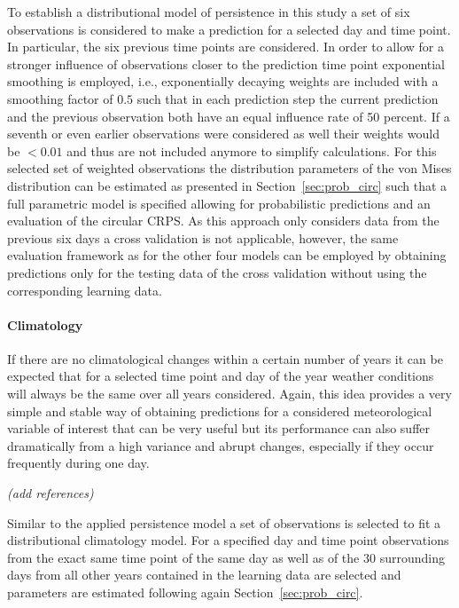 \documentclass[nojss]{jss}
\newcommand{\fixme}[1]{\emph{\marginpar{FIXME} (#1)}}
\numberwithin{equation}{section}
\begin{document}
To establish a distributional model of persistence in this study a set of six observations
is considered to make a prediction for a selected day and time point. In particular,
the six previous time points are considered. In order to allow for a stronger influence of 
observations closer to the prediction time point exponential smoothing is employed, i.e.,
exponentially decaying weights are included with a smoothing factor of $0.5$ such that
in each prediction step the current prediction and the previous observation both have an 
equal influence rate of 50 percent. If a seventh or even earlier observations were considered 
as well their weights would be $<0.01$ and thus are not included anymore to simplify calculations.
For this selected set of weighted observations the distribution parameters of the von Mises 
distribution can be estimated as presented in Section~\ref{sec:prob_circ} such that a full
parametric model is specified allowing for probabilistic predictions and an evaluation of the 
circular CRPS.
As this approach only considers data from the previous six days a cross validation is not 
applicable, however, the same evaluation framework as for the other four models can be employed 
by obtaining predictions only for the testing data of the cross validation without using 
the corresponding learning data.

\paragraph{Climatology}
If there are no climatological changes within a certain number of years it can be expected that 
for a selected time point and day of the year weather conditions will always be the same over all 
years considered.
Again, this idea provides a very simple and stable way of obtaining predictions for a considered 
meteorological variable of interest that can be very useful but its performance can also suffer 
dramatically from a high variance and abrupt changes, especially if they occur frequently during one day.

\fixme{add references}

Similar to the applied persistence model a set of observations is selected to fit a distributional
climatology model. For a specified day and time point observations from the exact same time point of 
the same day as well as of the 30 surrounding days from all other years contained in the learning data 
are selected and parameters are estimated following again Section~\ref{sec:prob_circ}.
\end{document}
